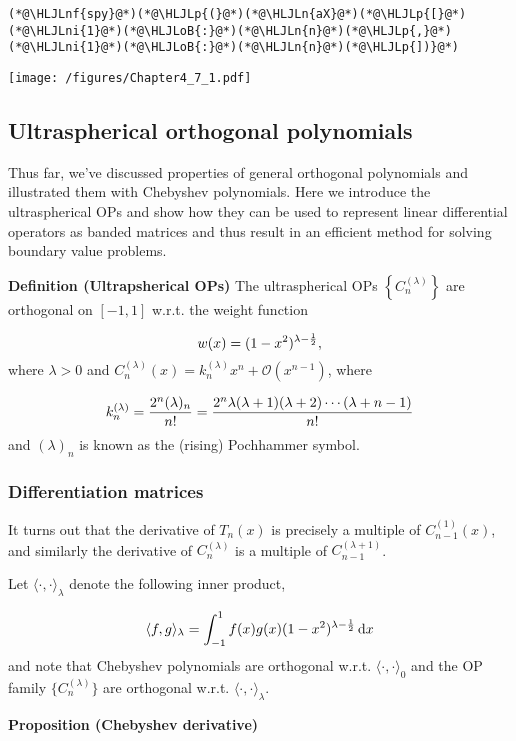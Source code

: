 \documentclass[12pt,landscape]{article}
\newcommand{\HLJLn}[1]{#1}
\newcommand{\HLJLnf}[1]{\textcolor[RGB]{66,102,213}{#1}}
\newcommand{\HLJLni}[1]{\textcolor[RGB]{59,151,46}{#1}}
\newcommand{\HLJLoB}[1]{\textcolor[RGB]{102,102,102}{\textbf{#1}}}
\newcommand{\HLJLp}[1]{#1}
\begin{document}
{\begin{lstlisting}
(*@\HLJLnf{spy}@*)(*@\HLJLp{(}@*)(*@\HLJLn{aX}@*)(*@\HLJLp{[}@*)(*@\HLJLni{1}@*)(*@\HLJLoB{:}@*)(*@\HLJLn{n}@*)(*@\HLJLp{,}@*)(*@\HLJLni{1}@*)(*@\HLJLoB{:}@*)(*@\HLJLn{n}@*)(*@\HLJLp{])}@*)
\end{lstlisting}

\texttt{[image: /figures/Chapter4\_7\_1.pdf]}

\subsection{Ultraspherical orthogonal polynomials}
Thus far, we've discussed properties of general orthogonal polynomials and illustrated them with Chebyshev polynomials.  Here we introduce the ultraspherical OPs and show how they can be used to represent linear differential operators as banded matrices and thus result in an efficient method for solving boundary value problems.

\textbf{Definition (Ultrapsherical OPs)} The ultraspherical OPs $\left\lbrace C_n^{(\lambda)} \right\rbrace$ are orthogonal on $[-1, 1]$ w.r.t. the weight function

\[
w(x) = (1-x^2)^{\lambda - {1\over 2}},
\]
where  $\lambda > 0$ and $C_n^{(\lambda)}(x) = k^{(\lambda)}_{n}x^n + \mathcal{O}(x^{n-1})$, where

\[
k_n^{(\lambda)} = {2^n (\lambda)_n \over n!} = {2^n \lambda (\lambda+1) (\lambda+2) \cdots (\lambda+n-1)  \over n!}
\]
and $(\lambda)_n$ is known as the (rising) Pochhammer symbol.

\subsubsection{Differentiation matrices}
It turns out that the derivative of $T_n(x)$ is precisely a multiple of  $C^{(1)}_{n-1}(x)$, and similarly the derivative of $C_n^{(\lambda)}$ is a multiple of $C_{n-1}^{(\lambda+1)}$.

Let $\langle \cdot, \cdot \rangle_{\lambda}$ denote the following inner product,

\[
\langle f, g \rangle_{\lambda} = \int_{-1}^{1} f(x) g(x) (1-x^2)^{\lambda - \frac{1}{2}}\,{\rm d}x
\]
and note that Chebyshev polynomials are orthogonal w.r.t. $\langle \cdot, \cdot \rangle_{0}$ and the OP family $\{ C_n^{(\lambda)}\}$ are orthogonal w.r.t. $\langle \cdot, \cdot \rangle_{\lambda}$.

\textbf{Proposition (Chebyshev derivative)}

}
\end{document}
